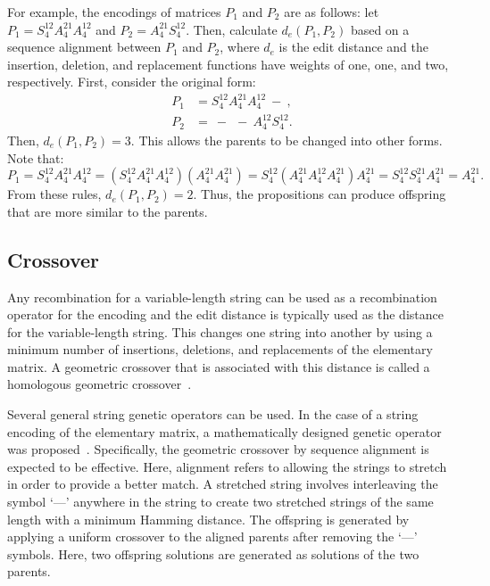 For example, the encodings of matrices $ P_1 $ and $ P_2 $ are as follows: let $ P_1=S_4^{12}A_4^{21}A_4^{12} $ and $ P_2=A_4^{21}S_4^{12} $. Then, calculate $ d_e\left(P_1,P_2\right) $ based on a sequence alignment between $ P_1 $ and $ P_2 $, where $ d_e $ is the edit distance and the insertion, deletion, and replacement functions have weights of one, one, and two, respectively. First, consider the original form:
\begin{align*}
P_1&=S_4^{12}A_4^{21}A_4^{12}\ -\ , \\
P_2&=\ -\ \ -\ A_4^{12}S_4^{12}.
\end{align*}
Then, $ d_e\left(P_1,P_2\right)=3 $. This allows the parents to be changed into other forms. Note that:
\begin{equation*}
P_1=S_4^{12} A_4^{21} A_4^{12} = \left(S_4^{12} A_4^{21} A_4^{12} \right) \left(A_4^{21} A_4^{21} \right) = S_4^{12} \left(A_4^{21} A_4^{12} A_4^{21}\right) A_4^{21} = S_4^{12} S_4^{21} A_4^{21} = A_4^{21}.    		
\end{equation*}
From these rules, $ d_e\left(P_1,P_2\right) = 2 $. Thus, the propositions can produce offspring that are more similar to the parents.

\subsection{Crossover} \label{sec52:crossover}
Any recombination for a variable-length string can be used as a recombination operator for the encoding and the edit distance is typically used as the distance for the variable-length string. This changes one string into another by using a minimum number of insertions, deletions, and replacements of the elementary matrix. A geometric crossover that is associated with this distance is called a homologous geometric crossover~\cite{moraglio2006geometric}.

Several general string genetic operators can be used. In the case of a string encoding of the elementary matrix, a mathematically designed genetic operator was proposed~\cite{yoon2014mathematical}. Specifically, the geometric crossover by sequence alignment is expected to be effective. Here, alignment refers to allowing the strings to stretch in order to provide a better match. A stretched string involves interleaving the symbol `—' anywhere in the string to create two stretched strings of the same length with a minimum Hamming distance. The offspring is generated by applying a uniform crossover to the aligned parents after removing the `—' symbols. Here, two offspring solutions are generated as solutions of the two parents.

